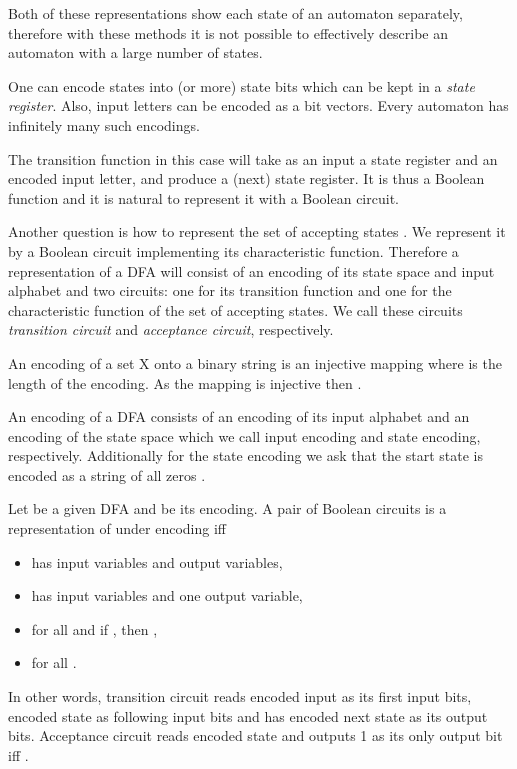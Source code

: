 \documentclass[copyright, creativecommons]{eptcs}
\newenvironment{definition}[1][Definition]{\begin{trivlist}
\item[\hskip \labelsep {\bfseries #1}]}{\end{trivlist}}
\begin{document}
Both of these representations show each state of an automaton separately, therefore with these methods
it is not possible to effectively describe an automaton with a large number of states.

One can encode  states into  (or more) state bits which can be kept in a
 \textit{state register}. Also, input letters can be encoded as a bit vectors. Every automaton
has infinitely many such encodings.

The transition function in this case will take as an input a state register and
an encoded input letter, and produce a (next) state register.
It is thus a Boolean function and it is natural to represent it with a Boolean circuit.

Another question is how to represent the set of accepting states . We represent it
by a Boolean circuit implementing its characteristic function.
Therefore a representation of
a DFA will consist of an encoding of its state space and input alphabet and two circuits:
one for its transition function and one for the characteristic function
of the set of accepting states.
We call these circuits \textit{transition circuit} and \textit{acceptance circuit}, respectively.


An encoding  of a set X onto a binary string is an injective mapping 
where  is the length of the encoding. As the mapping is injective then .

An encoding of a DFA consists of an encoding of its input alphabet  and an encoding of the state space 
which we call input encoding and state encoding, respectively. Additionally for the state encoding
we ask that the start state is encoded as a string of all zeros .


\begin{definition}
Let  be a given DFA and  be its encoding.
A pair of Boolean circuits  is a representation of  under encoding  iff
\begin{itemize}
\item  has  input variables and  output variables,
\item  has  input variables and one output variable,
\item for all  and  if , then ,
\item  for all .
\end{itemize}
\end{definition}

In other words, transition circuit 
reads encoded input  as its first  input bits, encoded state  as following
 input bits and has encoded next state  as its  output bits.
Acceptance circuit  reads encoded state   and
outputs 1 as its only output bit iff .
\end{document}
